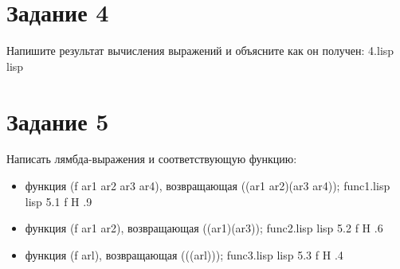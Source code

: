 \section{Задание 4}
Напишите результат вычисления выражений и объясните как он получен:
{4.lisp}
{lisp}
{}

\section{Задание 5}
Написать лямбда-выражения и соответствующую функцию:
\begin{itemize}
	\item функция (f ar1 ar2 ar3 ar4), возвращающая ((ar1 ar2)(ar3 ar4));
	{func1.lisp}
	{lisp}
	{}
	{5.1}
	{f}
	{H}
	{.9\textwidth}
	{}
	\item функция (f ar1 ar2), возвращающая ((ar1)(ar3));
	{func2.lisp}
	{lisp}
	{}
	{5.2}
	{f}
	{H}
	{.6\textwidth}
	{}
	\clearpage
	\item функция (f arl), возвращающая (((arl)));
	{func3.lisp}
	{lisp}
	{}
	{5.3}
	{f}
	{H}
	{.4\textwidth}
	{}
\end{itemize}